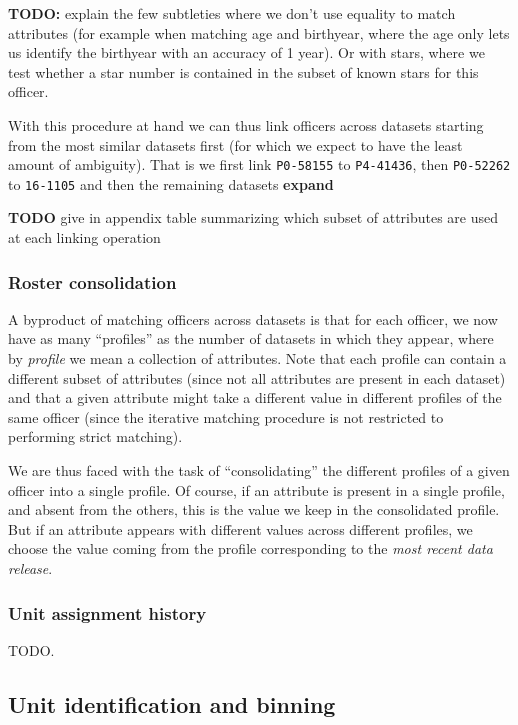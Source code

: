 \textbf{TODO:} explain the few subtleties where we don't use equality to match
attributes (for example when matching age and birthyear, where the age only
lets us identify the birthyear with an accuracy of 1 year). Or with stars,
where we test whether a star number is contained in the subset of known stars
for this officer.

With this procedure at hand we can thus link officers across datasets starting
from the most similar datasets first (for which we expect to have the least
amount of ambiguity). That is we first link \texttt{P0-58155} to
\texttt{P4-41436}, then \texttt{P0-52262} to \texttt{16-1105} and then the
remaining datasets \textbf{expand}

\textbf{TODO} give in appendix table summarizing which subset of attributes are
used at each linking operation 

\subsubsection{Roster consolidation}

A byproduct of matching officers across datasets is that for each officer, we
now have as many “profiles” as the number of datasets in which they appear,
where by \emph{profile} we mean a collection of attributes. Note that each
profile can contain a different subset of attributes (since not all attributes
are present in each dataset) and that a given attribute might take a different
value in different profiles of the same officer (since the iterative matching
procedure is not restricted to performing strict matching).

We are thus faced with the task of “consolidating” the different profiles of
a given officer into a single profile. Of course, if an attribute is present in
a single profile, and absent from the others, this is the value we keep in the
consolidated profile. But if an attribute appears with different values across
different profiles, we choose the value coming from the profile corresponding
to the \emph{most recent data release}.

\subsubsection{Unit assignment history} TODO.


\subsection{Unit identification and binning}
